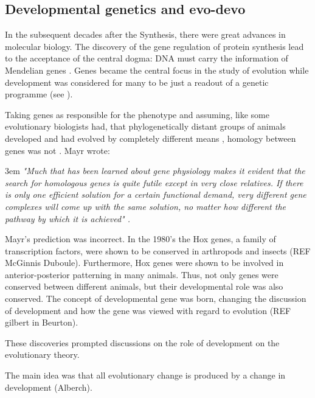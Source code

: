 \subsection{Developmental genetics and evo-devo}

In the subsequent decades after the Synthesis, there were great advances in molecular biology. The discovery of the gene regulation of protein synthesis \citep{Jacob1961} lead to the acceptance of the central dogma: DNA must carry the information of Mendelian genes \citep{Crick1958,Crick1970}. 
Genes became the central focus in the study of evolution while development was considered for many to be just a readout of a genetic programme (see \citealp{foxkeller2000geneprogram}).

Taking genes as responsible for the phenotype and assuming, like some evolutionary biologists had, that phylogenetically distant groups of animals developed and had evolved by completely different means \citep{carroll2005endless}, homology between genes was not . Mayr wrote:
\begin{flushleft}
\leftskip3em
\rightskip\leftskip
\footnotesize{
\textit{
"Much that has been learned about gene physiology makes it evident that the search for homologous genes is quite futile except in very close relatives. If there is only one efficient solution for a certain functional demand, very different gene complexes will come up with the same solution, no matter how different the pathway by which it is achieved" \citep{Mayr1966}.}}
\end{flushleft}

Mayr's prediction was incorrect. In the 1980's the Hox genes, a family of transcription factors, were shown to be conserved in arthropods and insects (REF McGinnis Duboule).
Furthermore, Hox genes were shown to be involved in anterior-posterior patterning in many animals.
Thus, not only genes were conserved between different animals, but their developmental role was also conserved. 
The concept of developmental gene was born, changing the discussion of development and how the gene was viewed with regard to evolution (REF gilbert in Beurton).

These discoveries prompted discussions on the role of development on the evolutionary theory.

The main idea was that all evolutionary change is produced by a change in development (Alberch).

